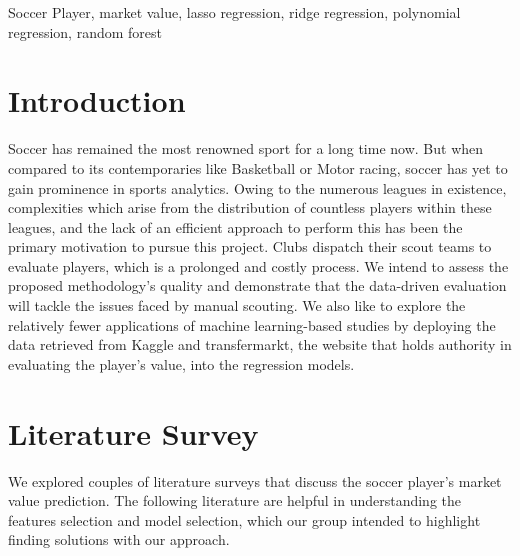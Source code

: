 \documentclass[conference]{IEEEtran}
\begin{document}
\begin{IEEEkeywords}
Soccer Player, market value, lasso regression, ridge regression, polynomial regression, random forest
\end{IEEEkeywords}

\section{Introduction}

Soccer has remained the most renowned sport for a long time now. But when compared to its contemporaries like Basketball or Motor racing, soccer has yet to gain prominence in sports analytics. Owing to the numerous leagues in existence, complexities which arise from the distribution of countless players within these leagues, and the lack of an efficient approach to perform this has been the primary motivation to pursue this project. Clubs dispatch their scout teams to evaluate players, which is a prolonged and costly process. We intend to assess the proposed methodology's quality and demonstrate that the data-driven evaluation will tackle the issues faced by manual scouting. We also like to explore the relatively fewer applications of machine learning-based studies by deploying the data retrieved from Kaggle and transfermarkt, the website that holds authority in evaluating the player's value, into the regression models.



\section{Literature Survey}

We explored couples of literature surveys that discuss the soccer player's market value prediction. The following literature are helpful in understanding the features selection and model selection, which our group intended to highlight finding solutions with our approach.\par
\end{document}

